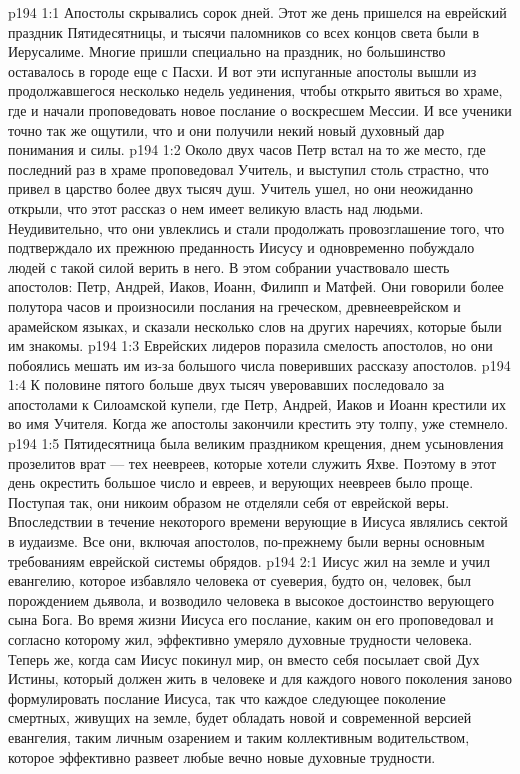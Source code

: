 \vs p194 1:1 Апостолы скрывались сорок дней. Этот же день пришелся на еврейский праздник Пятидесятницы, и тысячи паломников со всех концов света были в Иерусалиме. Многие пришли специально на праздник, но большинство оставалось в городе еще с Пасхи. И вот эти испуганные апостолы вышли из продолжавшегося несколько недель уединения, чтобы открыто явиться во храме, где и начали проповедовать новое послание о воскресшем Мессии. И все ученики точно так же ощутили, что и они получили некий новый духовный дар понимания и силы.
\vs p194 1:2 Около двух часов Петр встал на то же место, где последний раз в храме проповедовал Учитель, и выступил столь страстно, что привел в царство более двух тысяч душ. Учитель ушел, но они неожиданно открыли, что этот рассказ о нем имеет великую власть над людьми. Неудивительно, что они увлеклись и стали продолжать провозглашение того, что подтверждало их прежнюю преданность Иисусу и одновременно побуждало людей с такой силой верить в него. В этом собрании участвовало шесть апостолов: Петр, Андрей, Иаков, Иоанн, Филипп и Матфей. Они говорили более полутора часов и произносили послания на греческом, древнееврейском и арамейском языках, и сказали несколько слов на других наречиях, которые были им знакомы.
\vs p194 1:3 Еврейских лидеров поразила смелость апостолов, но они побоялись мешать им из\hyp{}за большого числа поверивших рассказу апостолов.
\vs p194 1:4 К половине пятого больше двух тысяч уверовавших последовало за апостолами к Силоамской купели, где Петр, Андрей, Иаков и Иоанн крестили их во имя Учителя. Когда же апостолы закончили крестить эту толпу, уже стемнело.
\vs p194 1:5 Пятидесятница была великим праздником крещения, днем усыновления прозелитов врат --- тех неевреев, которые хотели служить Яхве. Поэтому в этот день окрестить большое число и евреев, и верующих неевреев было проще. Поступая так, они никоим образом не отделяли себя от еврейской веры. Впоследствии в течение некоторого времени верующие в Иисуса являлись сектой в иудаизме. Все они, включая апостолов, по\hyp{}прежнему были верны основным требованиям еврейской системы обрядов.
\vs p194 2:1 Иисус жил на земле и учил евангелию, которое избавляло человека от суеверия, будто он, человек, был порождением дьявола, и возводило человека в высокое достоинство верующего сына Бога. Во время жизни Иисуса его послание, каким он его проповедовал и согласно которому жил, эффективно умеряло духовные трудности человека. Теперь же, когда сам Иисус покинул мир, он вместо себя посылает свой Дух Истины, который должен жить в человеке и для каждого нового поколения заново формулировать послание Иисуса, так что каждое следующее поколение смертных, живущих на земле, будет обладать новой и современной версией евангелия, таким личным озарением и таким коллективным водительством, которое эффективно развеет любые вечно новые духовные трудности.
